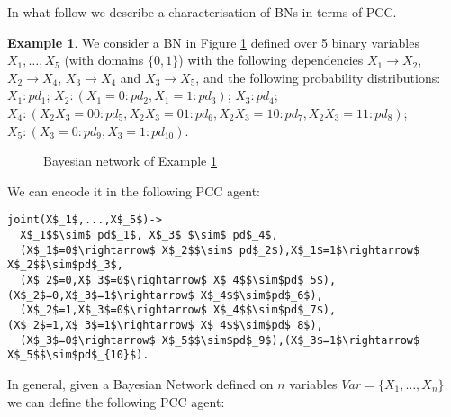 \documentclass[letterpaper]{article}
\theoremstyle{plain}
\theoremstyle{definition}
\theoremstyle{remark}
\theoremstyle{definition}
\newtheorem{example}{Example}[section]
\begin{document}
In what follow we describe a characterisation of BNs in terms of PCC.
\begin{example}\label{exBN}
We consider a BN in Figure \ref{BN} 
defined over 5 binary variables $X_1, \ldots, X_5$ (with domains $\{0,1\}$) with the following dependencies $X_1 \rightarrow X_2$, $X_2 \rightarrow X_4$, $X_3 \rightarrow X_4$ and $X_3 \rightarrow X_5$, and the following probability distributions:
$X_1 : pd_1$; $X_2 : (X_1 = 0 : pd_2, X_1=1 : pd_3)$; $X_3 : pd_4$; $X_4 : (X_2 X_3 = 0 0  : pd_5, X_2 X_3 = 0 1  : pd_6, X_2 X_3 = 1 0  : pd_7, X_2  X_3 = 1 1  : pd_8)$; $X_5 : (X_3 = 0 : pd_9, X_3=1 : pd_{10})$.
\begin{figure}[h!]
\begin{center}
\scriptsize
{}
\caption{Bayesian network of Example \ref{exBN}}
\label{BN}
\end{center}
\end{figure}
We can encode it in the following PCC agent: 
\begin{lstlisting}[mathescape=true]
joint(X$_1$,...,X$_5$)->
  X$_1$$\sim$ pd$_1$, X$_3$ $\sim$ pd$_4$, 
  (X$_1$=0$\rightarrow$ X$_2$$\sim$ pd$_2$),X$_1$=1$\rightarrow$ X$_2$$\sim$pd$_3$,
  (X$_2$=0,X$_3$=0$\rightarrow$ X$_4$$\sim$pd$_5$),(X$_2$=0,X$_3$=1$\rightarrow$ X$_4$$\sim$pd$_6$),
  (X$_2$=1,X$_3$=0$\rightarrow$ X$_4$$\sim$pd$_7$),(X$_2$=1,X$_3$=1$\rightarrow$ X$_4$$\sim$pd$_8$),
  (X$_3$=0$\rightarrow$ X$_5$$\sim$pd$_9$),(X$_3$=1$\rightarrow$ X$_5$$\sim$pd$_{10}$). 
 \end{lstlisting}
\end{example}

In general, given a Bayesian Network defined on $n$ variables $Var=\{X_1, \ldots, X_n\}$ we can define the following PCC agent:
\end{document}
